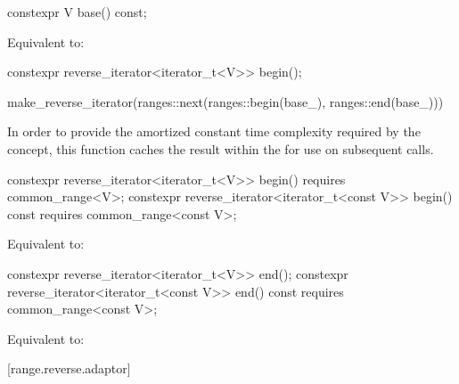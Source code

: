 %
\begin{itemdecl}
constexpr V base() const;
\end{itemdecl}

\begin{itemdescr}
\pnum
\effects
Equivalent to: 
\end{itemdescr}

%
\begin{itemdecl}
constexpr reverse_iterator<iterator_t<V>> begin();
\end{itemdecl}

\begin{itemdescr}
\pnum
\returns
\begin{codeblock}
make_reverse_iterator(ranges::next(ranges::begin(base_), ranges::end(base_)))
\end{codeblock}

\pnum
\remarks
In order to provide the amortized constant time complexity required by
the  concept, this function caches the result within the
 for use on subsequent calls.
\end{itemdescr}

%
\begin{itemdecl}
constexpr reverse_iterator<iterator_t<V>> begin() requires common_range<V>;
constexpr reverse_iterator<iterator_t<const V>> begin() const
  requires common_range<const V>;
\end{itemdecl}

\begin{itemdescr}
\pnum
\effects
Equivalent to: 
\end{itemdescr}

%
\begin{itemdecl}
constexpr reverse_iterator<iterator_t<V>> end();
constexpr reverse_iterator<iterator_t<const V>> end() const
  requires common_range<const V>;
\end{itemdecl}

\begin{itemdescr}
\pnum
\effects
Equivalent to: 
\end{itemdescr}

[range.reverse.adaptor]{}

